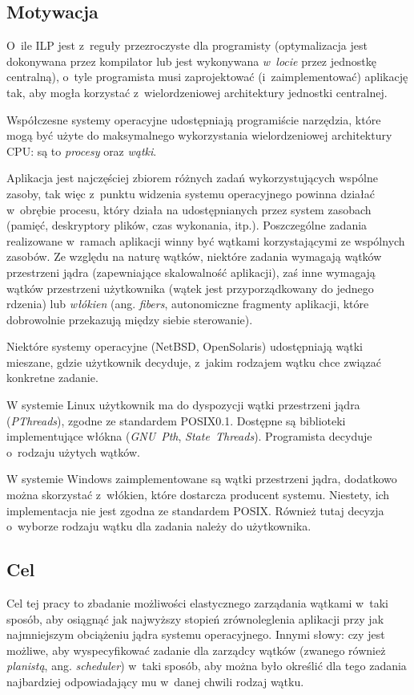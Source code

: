 \subsection{Motywacja} 
%
\indent
	O~ile ILP jest z~reguły przezroczyste dla programisty (optymalizacja jest dokonywana przez kompilator lub jest wykonywana \emph{w~locie}
	przez jednostkę centralną),	o~tyle programista musi zaprojektować (i~zaimplementować) aplikację tak, aby mogła korzystać z~wielordzeniowej
	architektury jednostki centralnej.
\par
%
\indent
	Współczesne systemy operacyjne udostępniają programiście narzędzia, które mogą być użyte do maksymalnego wykorzystania 
	wielordzeniowej architektury CPU: są to \emph{procesy} oraz \emph{wątki}.
\par
%
\indent
	Aplikacja jest najczęściej zbiorem różnych zadań wykorzystujących wspólne zasoby, tak więc z~punktu widzenia systemu operacyjnego 
	powinna działać w~obrębie procesu, który działa na udostępnianych przez system zasobach (pamięć, deskryptory plików, czas wykonania, itp.).
	Poszczególne zadania realizowane w~ramach aplikacji winny być wątkami korzystającymi ze wspólnych zasobów.
	Ze względu na naturę wątków, niektóre zadania wymagają wątków przestrzeni jądra (zapewniające skalowalność aplikacji), zaś inne wymagają
	wątków przestrzeni użytkownika (wątek jest przyporządkowany do jednego rdzenia) lub \emph{włókien} (ang. \emph{fibers}, autonomiczne fragmenty
	aplikacji, które dobrowolnie przekazują między siebie sterowanie).
\par
%
\indent
	Niektóre systemy operacyjne (NetBSD, OpenSolaris) udostępniają wątki mieszane, gdzie użytkownik decyduje, z~jakim rodzajem wątku 
	chce związać konkretne zadanie.
\par
%
\indent
	W systemie Linux użytkownik ma do dyspozycji wątki przestrzeni jądra \linebreak (\emph{PThreads}), zgodne ze standardem POSIX0.1.
	Dostępne są biblioteki implementujące włókna (\emph{GNU~Pth}, \emph{State~Threads}). Programista decyduje o~rodzaju użytych wątków.
\par
%
\indent
	W systemie Windows zaimplementowane są wątki przestrzeni jądra, dodatkowo można skorzystać z~włókien, które dostarcza producent systemu.
	Niestety, ich implementacja nie jest zgodna ze standardem POSIX. Również tutaj decyzja o~wyborze rodzaju wątku dla zadania należy do użytkownika.
\par
%
\subsection{Cel}
%
\indent
	Cel tej pracy to zbadanie możliwości elastycznego zarządania wątkami w~taki sposób, aby osiągnąć jak najwyższy stopień zrównoleglenia
	aplikacji przy jak najmniejszym obciążeniu jądra systemu operacyjnego. Innymi słowy: czy jest możliwe, aby wyspecyfikować zadanie
	dla zarządcy wątków (zwanego również \emph{planistą}, ang. \emph{scheduler}) w~taki sposób, aby można było określić dla tego zadania
	najbardziej odpowiadający mu w~danej chwili rodzaj wątku.
\par
